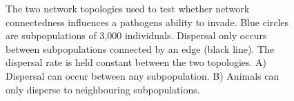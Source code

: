 \begin{figure}[t]
{\centering 
{}
}
\caption[Network topologies used to compare network connectedness]{
The two network topologies used to test whether network connectedness influences a pathogens ability to invade.
Blue circles are subpopulations of 3,000 individuals.
Dispersal only occurs between subpopulations connected by an edge (black line).
The dispersal rate is held constant between the two topologies.
A) Dispersal can occur between any subpopulation.
B) Animals can only disperse to neighbouring subpopulations. 
}
\label{f:net}
\end{figure}















